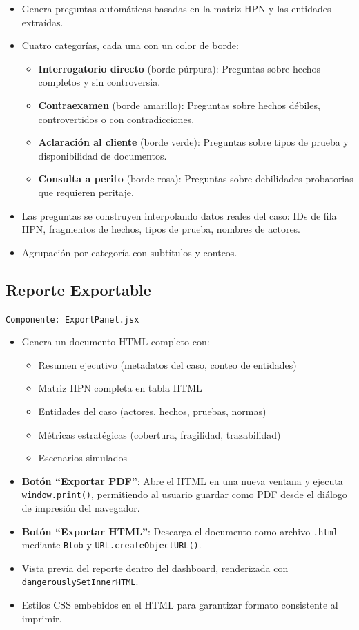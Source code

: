 \documentclass[12pt, letterpaper]{article}
\begin{document}
\begin{itemize}[nosep]
  \item Genera preguntas automáticas basadas en la matriz HPN y las
    entidades extraídas.
  \item Cuatro categorías, cada una con un color de borde:
    \begin{itemize}[nosep]
      \item \textbf{Interrogatorio directo} (borde púrpura):
        Preguntas sobre hechos completos y sin controversia.
      \item \textbf{Contraexamen} (borde amarillo): Preguntas sobre
        hechos débiles, controvertidos o con contradicciones.
      \item \textbf{Aclaración al cliente} (borde verde): Preguntas
        sobre tipos de prueba y disponibilidad de documentos.
      \item \textbf{Consulta a perito} (borde rosa): Preguntas sobre
        debilidades probatorias que requieren peritaje.
    \end{itemize}
  \item Las preguntas se construyen interpolando datos reales del
    caso: IDs de fila HPN, fragmentos de hechos, tipos de prueba,
    nombres de actores.
  \item Agrupación por categoría con subtítulos y conteos.
\end{itemize}

\subsection{Reporte Exportable}

\texttt{Componente: ExportPanel.jsx}

\begin{itemize}[nosep]
  \item Genera un documento HTML completo con:
    \begin{itemize}[nosep]
      \item Resumen ejecutivo (metadatos del caso, conteo de
        entidades)
      \item Matriz HPN completa en tabla HTML
      \item Entidades del caso (actores, hechos, pruebas, normas)
      \item Métricas estratégicas (cobertura, fragilidad,
        trazabilidad)
      \item Escenarios simulados
    \end{itemize}
  \item \textbf{Botón ``Exportar PDF''}: Abre el HTML en una nueva
    ventana y ejecuta \texttt{window.print()}, permitiendo al
    usuario guardar como PDF desde el diálogo de impresión del
    navegador.
  \item \textbf{Botón ``Exportar HTML''}: Descarga el documento como
    archivo \texttt{.html} mediante \texttt{Blob} y
    \texttt{URL.createObjectURL()}.
  \item Vista previa del reporte dentro del dashboard, renderizada
    con \texttt{dangerouslySetInnerHTML}.
  \item Estilos CSS embebidos en el HTML para garantizar formato
    consistente al imprimir.
\end{itemize}
\end{document}
